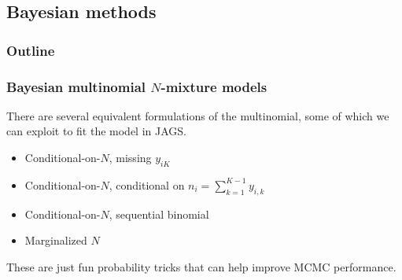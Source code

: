 \documentclass[color=usenames,dvipsnames]{beamer}\usepackage[]{graphicx}\usepackage[]{color}
\begin{document}
\subsection{Bayesian methods}


\begin{frame}
  \frametitle{Outline}
  \Large
\end{frame}


\begin{frame}
  \frametitle{Bayesian multinomial $N$-mixture models}
  There are several equivalent formulations of the multinomial, some
  of which we can exploit to fit the model in JAGS.
  \begin{itemize}
    \item Conditional-on-$N$, missing $y_{iK}$
    \item Conditional-on-$N$, conditional on $n_i=\sum_{k=1}^{K-1} y_{i,k}$
    \item Conditional-on-$N$, sequential binomial
    \item Marginalized $N$
  \end{itemize}
  \pause
  \vfill
  These are just fun probability tricks that can help improve MCMC performance. \\
\end{frame}




\end{document}

